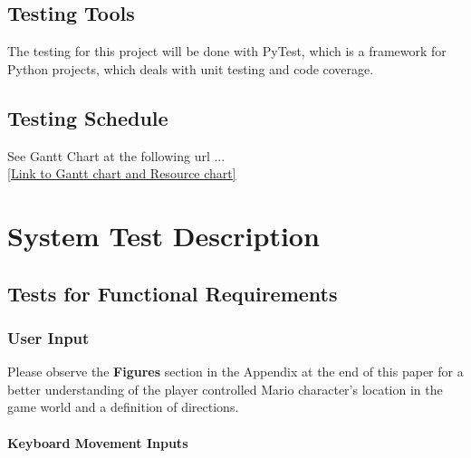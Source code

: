 \documentclass[12pt, titlepage]{article}
\begin{document}
\subsection{Testing Tools}
The testing for this project will be done with PyTest, which is a framework for
Python projects, which deals with unit testing and code coverage.



\subsection{Testing Schedule}
See Gantt Chart at the following url ...\\
\href{https://gitlab.cas.mcmaster.ca/jandricd/super-refactored-mario-bros/tree/master/ProjectSchedule}{[Link to Gantt chart and Resource chart]}



\section{System Test Description}

\subsection{Tests for Functional Requirements}

\subsubsection{User Input}

Please observe the \textbf{Figures} section in the Appendix at the end of this paper for a better understanding of the player controlled Mario character's location in the game world and a definition of directions.

\paragraph{Keyboard Movement Inputs}
\end{document}
